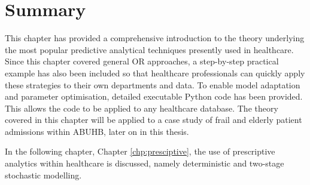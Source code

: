 \documentclass[../thesis.tex]{subfiles}
\begin{document}
\section{Summary}
This chapter has provided a comprehensive introduction to the theory underlying the most popular predictive analytical techniques presently used in healthcare. Since this chapter covered general OR approaches, a step-by-step practical example has also been included so that healthcare professionals can quickly apply these strategies to their own departments and data. To enable model adaptation and parameter optimisation, detailed executable Python code has been provided. This allows the code to be applied to any healthcare database. The theory covered in this chapter will be applied to a case study of frail and elderly patient admissions within ABUHB, later on in this thesis.

In the following chapter, Chapter \ref{chp:presciptive}, the use of prescriptive analytics within healthcare is discussed, namely deterministic and two-stage stochastic modelling.
\end{document}
